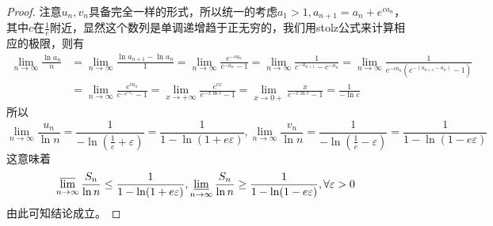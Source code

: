 \documentclass[../../main.tex]{subfiles}
\begin{document}
\begin{proof}
注意\(u_n,v_n\)具备完全一样的形式，所以统一的考虑\(a_1>1,a_{n + 1}=a_n + e^{ca_n}\)，其中\(c\)在\(\frac{1}{e}\)附近，显然这个数列是单调递增趋于正无穷的，我们用stolz公式来计算相应的极限，则有
\begin{align*}
\lim_{n\rightarrow\infty}\frac{\ln a_n}{n}&=\lim_{n\rightarrow\infty}\frac{\ln a_{n + 1}-\ln a_n}{1}=\lim_{n\rightarrow\infty}\frac{e^{-ca_n}}{c^{-a_n}-1}=\lim_{n\rightarrow\infty}\frac{1}{c^{-a_{n + 1}}-c^{-a_n}}=\lim_{n\rightarrow\infty}\frac{1}{e^{-ca_n}(c^{-(a_{n + 1}-a_n)}-1)}\\
&=\lim_{n\rightarrow\infty}\frac{e^{ca_n}}{c^{-e^{ca_n}}-1}=\lim_{x\rightarrow+\infty}\frac{e^{cx}}{e^{-x\ln c}-1}=\lim_{x\rightarrow0+}\frac{x}{e^{-x\ln c}-1}=\frac{1}{-\ln c}
\end{align*}
所以
\[\lim_{n\rightarrow\infty}\frac{u_n}{\ln n}=\frac{1}{-\ln(\frac{1}{e}+\varepsilon)}=\frac{1}{1-\ln(1 + e\varepsilon)},\lim_{n\rightarrow\infty}\frac{v_n}{\ln n}=\frac{1}{-\ln(\frac{1}{e}-\varepsilon)}=\frac{1}{1-\ln(1 - e\varepsilon)}\]
这意味着
\[\varlimsup_{n\rightarrow\infty}\frac{S_n}{\ln n}\leq\frac{1}{1-\ln(1 + e\varepsilon)},\varliminf_{n\rightarrow\infty}\frac{S_n}{\ln n}\geq\frac{1}{1-\ln(1 - e\varepsilon)},\forall\varepsilon>0\]
由此可知结论成立。
\end{proof}
\end{document}
